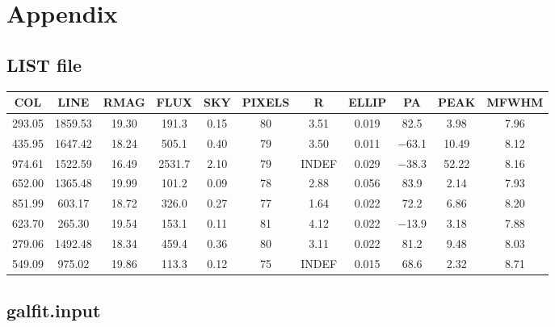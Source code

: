 \appendix
\section{Appendix}
\subsection{LIST file}\label{app:LIST}
\begin{tabular}{ccccccccccc}
   \toprule
COL & LINE & RMAG & FLUX & SKY & PIXELS & R & ELLIP & PA & PEAK & MFWHM\\
\midrule
\num{293.05} & \num{1859.53} & \num{19.30} & \num{191.3} & \num{0.15} & \num{80} & \num{3.51} & \num{0.019} & \num{82.5} & \num{3.98} & \num{7.96}\\
\num{435.95} & \num{1647.42} & \num{18.24} & \num{505.1} & \num{0.40} & \num{79} & \num{3.50} & \num{0.011} & \num{-63.1} & \num{10.49} & \num{8.12}\\
\num{974.61} & \num{1522.59} & \num{16.49} & \num{2531.7} & \num{2.10} & \num{79} & INDEF & \num{0.029} & \num{-38.3} & \num{52.22} & \num{8.16}\\
\num{652.00} & \num{1365.48} & \num{19.99} & \num{101.2} & \num{0.09} & \num{78} & \num{2.88} & \num{0.056} & \num{83.9} & \num{2.14} & \num{7.93}\\
\num{851.99} & \num{603.17} & \num{18.72} & \num{326.0} & \num{0.27} & \num{77} & \num{1.64} & \num{0.022} & \num{72.2} & \num{6.86} & \num{8.20}\\
\num{623.70} & \num{265.30} & \num{19.54} & \num{153.1} & \num{0.11} & \num{81} & \num{4.12} & \num{0.022} & \num{-13.9} & \num{3.18} & \num{7.88}\\
\num{279.06} & \num{1492.48} & \num{18.34} & \num{459.4} & \num{0.36} & \num{80} & \num{3.11} & \num{0.022} & \num{81.2} & \num{9.48} & \num{8.03}\\
\num{549.09} & \num{975.02} & \num{19.86} & \num{113.3} & \num{0.12} & \num{75} & INDEF & \num{0.015} & \num{68.6} & \num{2.32} & \num{8.71}\\
\bottomrule
\end{tabular}

\subsection{galfit.input}\label{app:galfit}

